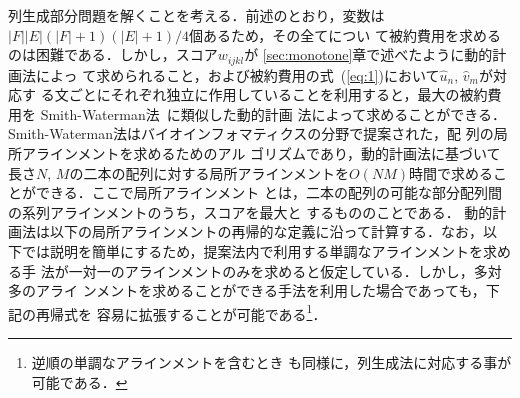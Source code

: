 \documentclass[japanese]{jnlp_1.4}
\begin{document}
列生成部分問題を解くことを考える．前述のとおり，変数は$|F||E|(|F|+1)(|E|+1)/4$個あるため，その全てについ
て被約費用を求めるのは困難である．しかし，スコア$w_{ijkl}$が
\ref{sec:monotone}章で述べたように動的計画法によっ
て求められること，および被約費用の式~(\ref{eq:1})において$\hat{u}_n$, $\hat{v}_m$が対応す
る文ごとにそれぞれ独立に作用していることを利用すると，最大の被約費用を
Smith-Waterman法~\cite{smith81:_ident_common_molec_subseq}に類似した動的計画
法によって求めることができる．Smith-Waterman法はバイオインフォマティクスの分野で提案された，配
列の局所アラインメントを求めるためのアル
ゴリズムであり，動的計画法に基づいて長さ$N$, $M$の二本の配列に対する局所アラインメントを$O(NM)$時間で求めることができる．ここで局所アラインメント
とは，二本の配列の可能な部分配列間の系列アラインメントのうち，スコアを最大と
するもののことである．
動的計画法は以下の局所アラインメントの再帰的な定義に沿って計算する．なお，以
下では説明を簡単にするため，提案法内で利用する単調なアラインメントを求める手
法が一対一のアラインメントのみを求めると仮定している．しかし，多対多のアライ
ンメントを求めることができる手法を利用した場合であっても，下記の再帰式を
容易に拡張することが可能である\footnote{逆順の単調なアラインメントを含むとき
も同様に，列生成法に対応する事が可能である．}．
\end{document}
